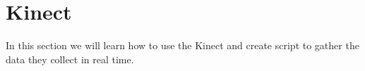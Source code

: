 \chapter{Kinect}

In this section we will learn how to use the Kinect and create script to gather the data they collect in real time.